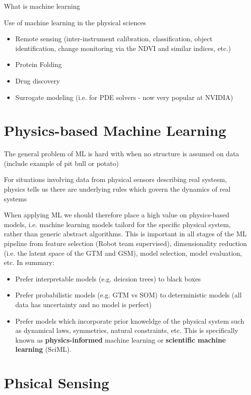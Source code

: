 What is machine learning

Use of machine learning in the physical sciences

\begin{itemize}
  \item Remote sensing (inter-instrument calibration, classification, object identification, change monitoring via the NDVI and similar indices, etc.)
  \item Protein Folding
  \item Drug discovery
  \item Surrogate modeling (i.e. for PDE solvers - now very popular at NVIDIA)
\end{itemize}




\section{Physics-based Machine Learning}

The general problem of ML is hard with when no structure is assumed on data (include example of pit bull or potato)

For situations involving data from physical sensors describing real systesm, physics tells us there are underlying rules which govern the dynamics of real systems

When applying ML we should therefore place a high value on physics-based models, i.e. machine learning models tailord for the specific physical system, rather than generic abstract algorithms. This is important in all stages of the ML pipeline from feature selection (Robot team supervised), dimensionality reduction (i.e. the latent space of the GTM and GSM), model selection, model evaluation, etc. In summary:

\begin{itemize}
  \item Prefer interpretable models (e.g. deicsion trees) to black boxes
  \item Prefer probabilistic models (e.g. GTM vs SOM) to deterministic models (all data has uncertainty and no model is perfect)
  \item Prefer models which incorporate prior knoweldge of the physical system such as dynamical laws, symmetries, natural constraints, etc. This is specifically known as \textbf{physics-informed} machine learning or \textbf{scientific machine learning}  (SciML).
\end{itemize}


\section{Phsical Sensing}


